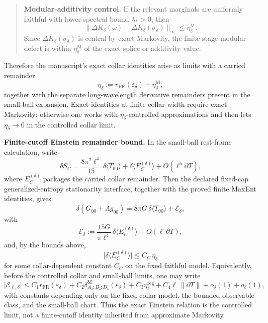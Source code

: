 \begin{quote}
\textbf{Modular-additivity control.} If the relevant marginals are uniformly faithful with lower spectral bound \(\lambda_\ast>0\), then
\[
\|\Delta K_\delta(\omega)-\Delta K_\delta(\sigma_\delta)\|_\infty
\le
\eta_\delta^{\mathrm M}.
\]
Since \(\Delta K_\delta(\sigma_\delta)\) is central by exact Markovity, the finite-stage modular defect is within \(\eta_\delta^{\mathrm M}\) of the exact splice or additivity value.
\end{quote}

Therefore the manuscript's exact collar identities arise as limits with a carried remainder
\[
\eta_\delta
:=
r_{\mathrm{FR}}(\varepsilon_\delta)
+
\eta_\delta^{\mathrm M},
\]
together with the separate long-wavelength derivative remainders present in the small-ball expansion. Exact identities at finite collar width require exact Markovity; otherwise one works with \(\eta_\delta\)-controlled approximations and then lets \(\eta_\delta\to0\) in the controlled collar limit.

\textbf{Finite-cutoff Einstein remainder bound.} In the small-ball rest-frame calculation, write
\[
\delta S_C
=
\frac{8\pi^2\ell^4}{15}\,\delta\langle T_{00}\rangle
+
\delta\langle E_C^{(\delta)}\rangle
+
O(\ell^5\partial T),
\]
where \(E_C^{(\delta)}\) packages the carried collar remainder. Then the declared fixed-cap generalized-entropy stationarity interface, together with the proved finite MaxEnt identities, gives
\[
\delta\!\left(G_{00}+\Lambda g_{00}\right)
=
8\pi G\,\delta\langle T_{00}\rangle
+
\mathcal E_\delta,
\]
with
\[
\mathcal E_\delta
:=
\frac{15G}{\pi\ell^4}\,
\delta\langle E_C^{(\delta)}\rangle
+
O(\ell\,\partial T),
\]
and, by the bounds above,
\[
\bigl|
\delta\langle E_C^{(\delta)}\rangle
\bigr|
\le
C_C\,\eta_\delta
\]
for some collar-dependent constant \(C_C\) on the fixed faithful model.
Equivalently, before the controlled collar and small-ball limits, one may write
\[
\bigl|\mathcal E_{\ell,\delta}\bigr|
\le
C_1 r_{\mathrm{FR}}(\varepsilon_\delta)
+C_2\delta^{\mathrm M}_{A_\delta:B_\delta:D_\delta}(\varepsilon_\delta)
+C_3\eta^{\mathrm{reg}}_\delta
+C_4\ell\,\|\partial T\|
+o_\delta(1)+o_\ell(1),
\]
with constants depending only on the fixed collar model, the bounded observable class, and the
small-ball chart. Thus the exact Einstein relation is the controlled limit, not a finite-cutoff
identity inherited from approximate Markovity.

